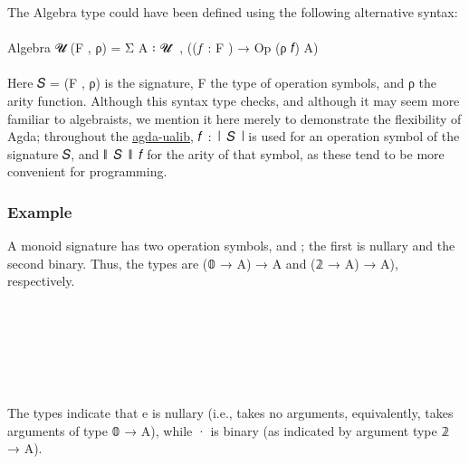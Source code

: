 \documentclass[sigplan,screen]{acmart}
\newcommand{\agdaualib}{\href{https://ualib.org}{agda-ualib}\xspace}
\newcommand{\agdaualib}{\href{anonymizedLink/agda-ualib.html}{agda-ualib}\xspace}
\begin{document}
The Algebra type could have been defined using the following alternative syntax:\\
\\
  Algebra 𝓤 (F , ρ) = Σ A ꞉ 𝓤 ̇ , ((𝑓 : F ) → Op (ρ 𝑓) A)\\
\\
Here 𝑆 = (F , ρ) is the signature, F the type of operation symbols, and ρ the arity function. Although this syntax type checks, and although it may seem more familiar to algebraists, we mention it here merely to demonstrate the flexibility of Agda; throughout the \agdaualib, 𝑓~:~∣~𝑆~∣ is used for an operation symbol of the signature 𝑆, and ∥~𝑆~∥~𝑓 for the arity of that symbol, as these tend to be more convenient for programming.

\subsubsection{Example}
A monoid signature has two operation symbols,  and ; the first is nullary and the second binary. Thus, the types are (𝟘 → A) → A and (𝟚 → A) → A), respectively.
\begin{code}%
\>[0]\AgdaSpace{}%
\AgdaSpace{}%
\AgdaSymbol{:}\AgdaSpace{}%
\AgdaSpace{}%
\AgdaSpace{}%
\<%
\\
\>[0][@{}l@{\AgdaIndent{0}}]%
\>[1]\AgdaSpace{}%
\AgdaSymbol{:}\AgdaSpace{}%
\<%
\\
%
\>[1]\AgdaSpace{}%
\AgdaSymbol{:}\AgdaSpace{}%
\<%
\\
%
\\[\AgdaEmptyExtraSkip]%
\>[0]\AgdaSpace{}%
\AgdaSymbol{:}\AgdaSpace{}%
\AgdaSpace{}%
\AgdaSymbol{\AgdaUnderscore{}}\AgdaSpace{}%
\AgdaSymbol{\AgdaUnderscore{}}\<%
\\
\>[0]\AgdaSpace{}%
\AgdaSymbol{=}\AgdaSpace{}%
\AgdaSpace{}%
\AgdaOperator{\AgdaInductiveConstructor{,}}\AgdaSpace{}%
\AgdaSpace{}%
\AgdaSymbol{\{}\AgdaSpace{}%
\AgdaSpace{}%
\AgdaSpace{}%
\AgdaSymbol{;}\AgdaSpace{}%
\AgdaSpace{}%
\AgdaSpace{}%
\AgdaSpace{}%
\AgdaSymbol{\}}\<%
\end{code}
The types indicate that e is nullary (i.e., takes no arguments, equivalently, takes arguments of type 𝟘 → A), while · is binary (as indicated  by argument type 𝟚 → A).
\end{document}
